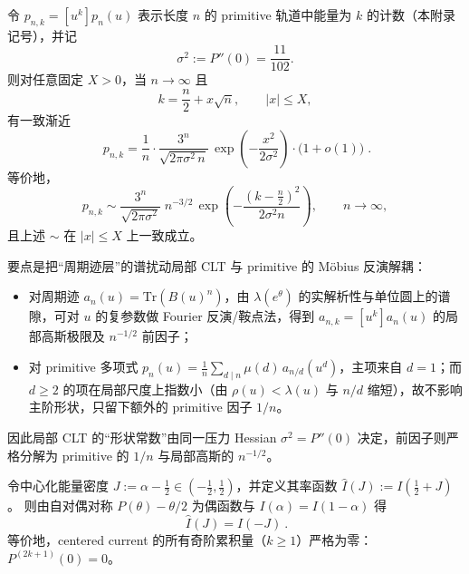 \begin{theorem}\label{thm:prime-local-clt}
令 \(p_{n,k}=[u^k]p_n(u)\) 表示长度 \(n\) 的 primitive 轨道中能量为 \(k\) 的计数（本附录记号），并记
\[
\sigma^2:=P''(0)=\frac{11}{102}.
\]
则对任意固定 \(X>0\)，当 \(n\to\infty\) 且
\[
k=\frac{n}{2}+x\sqrt{n},\qquad |x|\le X,
\]
有一致渐近
\[
\boxed{\;
p_{n,k}
=\frac{1}{n}\cdot \frac{3^n}{\sqrt{2\pi\sigma^2\,n}}\,
\exp\!\left(-\frac{x^2}{2\sigma^2}\right)\cdot \bigl(1+o(1)\bigr)\; }.
\]
等价地，
\[
p_{n,k}\sim \frac{3^n}{\sqrt{2\pi\sigma^2}}\;n^{-3/2}\,
\exp\!\left(-\frac{(k-\frac{n}{2})^2}{2\sigma^2 n}\right),
\qquad n\to\infty,
\]
且上述 \(\sim\) 在 \(|x|\le X\) 上一致成立。
\end{theorem}
\begin{remark}\label{rem:prime-local-clt-proof-idea}
要点是把“周期迹层”的谱扰动局部 CLT 与 primitive 的 Möbius 反演解耦：
\begin{itemize}
  \item 对周期迹 \(a_n(u)=\mathrm{Tr}(B(u)^n)\)，由 \(\lambda(e^\theta)\) 的实解析性与单位圆上的谱隙，可对 \(u\) 的复参数做 Fourier 反演/鞍点法，得到 \(a_{n,k}=[u^k]a_n(u)\) 的局部高斯极限及 \(n^{-1/2}\) 前因子；
  \item 对 primitive 多项式 \(p_n(u)=\frac{1}{n}\sum_{d\mid n}\mu(d)\,a_{n/d}(u^d)\)，主项来自 \(d=1\)；而 \(d\ge 2\) 的项在局部尺度上指数小（由 \(\rho(u)<\lambda(u)\) 与 \(n/d\) 缩短），故不影响主阶形状，只留下额外的 primitive 因子 \(1/n\)。
\end{itemize}
因此局部 CLT 的“形状常数”由同一压力 Hessian \(\sigma^2=P''(0)\) 决定，前因子则严格分解为 primitive 的 \(1/n\) 与局部高斯的 \(n^{-1/2}\)。
\end{remark}

\begin{proposition}\label{prop:fluctuation-even}
令中心化能量密度 \(J:=\alpha-\tfrac12\in(-\tfrac12,\tfrac12)\)，并定义其率函数
\(
\widehat I(J):=I(\tfrac12+J)
\)。
则由自对偶对称 \(P(\theta)-\theta/2\) 为偶函数与 \(I(\alpha)=I(1-\alpha)\) 得
\[
\boxed{\ \widehat I(J)=\widehat I(-J)\ }.
\]
等价地，centered current 的所有奇阶累积量（\(k\ge 1\)）严格为零：\(P^{(2k+1)}(0)=0\)。
\end{proposition}


